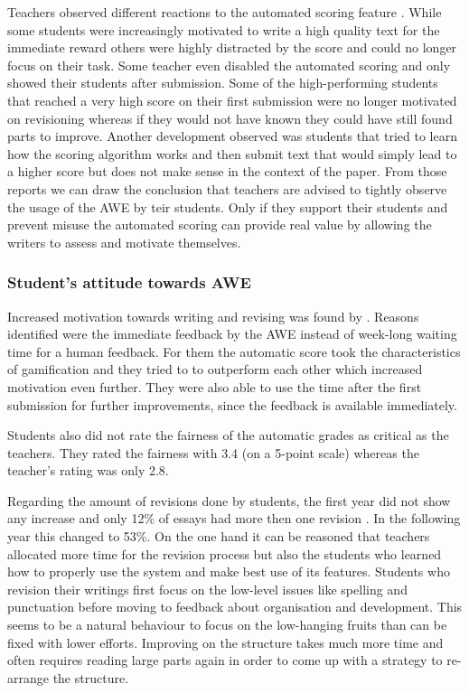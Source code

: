 \documentclass[runningheads]{llncs}
\begin{document}
Teachers observed different reactions to the automated scoring feature \citep{grimes_utility_2010}. While some students were increasingly motivated to write a high quality text for the immediate reward others were highly distracted by the score and could no longer focus on their task. Some teacher even disabled the automated scoring and only showed their students after submission. Some of the high-performing students that reached a very high score on their first submission were no longer motivated on revisioning whereas if they would not have known they could have still found parts to improve. Another development observed was students that tried to learn how the scoring algorithm works and then submit text that would simply lead to a higher score but does not make sense in the context of the paper. From those reports we can draw the conclusion that teachers are advised to tightly observe the usage of the AWE by teir students. Only if they support their students and prevent misuse the automated scoring can provide real value by allowing the writers to assess and motivate themselves.

\subsubsection{Student's attitude towards AWE}
Increased motivation towards writing and revising was found by \textcite{grimes_utility_2010}. Reasons identified were the immediate feedback by the AWE instead of week-long waiting time for a human feedback. For them the automatic score took the characteristics of gamification and they tried to to outperform each other which increased motivation even further. They were also able to use the time after the first submission for further improvements, since the feedback is available immediately.

Students also did not rate the fairness of the automatic grades as critical as the teachers. They rated the fairness with 3.4 (on a 5-point scale) whereas the teacher's rating was only 2.8.

Regarding the amount of revisions done by students, the first year did not show any increase and only 12\% of essays had more then one revision \citep{grimes_utility_2010}. In the following year this changed to 53\%. On the one hand it can be reasoned that teachers allocated more time for the revision process but also the students who learned how to properly use the system and make best use of  its features.   Students who revision their writings first focus on the low-level issues like spelling and punctuation before moving to feedback about organisation and development. This seems to be a natural behaviour to focus on the low-hanging fruits than can be fixed with lower efforts. Improving on the structure takes much more time and often requires reading large parts again in order to come up with a strategy to re-arrange the structure.
\end{document}
